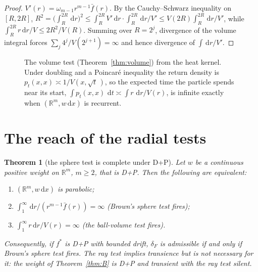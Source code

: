 \documentclass[11pt]{amsart}
\newcommand{\R}{\mathbb{R}}
\newcommand{\dd}{\,\mathrm{d}}
\newcommand{\fbar}{\bar f}
\theoremstyle{plain}
\newtheorem{theorem}{Theorem}[section]
\theoremstyle{definition}
\theoremstyle{remark}
\begin{document}
\begin{proof}
$V'(r)=\omega_{m-1}r^{m-1}\fbar(r)$. By the Cauchy--Schwarz inequality on
$[R,2R]$, $R^2=\bigl(\int_R^{2R}\dd r\bigr)^2\le\int_R^{2R}V'\dd r\cdot
\int_R^{2R}\dd r/V'\le V(2R)\int_R^{2R}\dd r/V'$, while
$\int_R^{2R}r\dd r/V\le2R^2/V(R)$. Summing over $R=2^j$, divergence of the
volume integral forces $\sum_j4^j/V(2^{j+1})=\infty$ and hence divergence of
$\int\dd r/V'$.
\end{proof}

\begin{figure}[t]
\centering
{}
\caption{The volume test (Theorem~\ref{thm:volume}) from the heat kernel. Under
doubling and a Poincar\'e inequality the return density is
$p_t(x,x)\asymp1/V(x,\sqrt t\,)$, so the expected time the particle spends near
its start, $\int p_t(x,x)\,\dd t\asymp\int r\,\dd r/V(r)$, is infinite exactly
when $(\R^m,w\dd x)$ is recurrent.}
\label{fig:heatkernel}
\end{figure}

\section{The reach of the radial tests}\label{sec:reach}

\begin{theorem}[the sphere test is complete under D+P]\label{thm:A}
Let $w$ be a continuous positive weight on $\R^m$, $m\ge2$, that is D+P. Then
the following are equivalent:
\begin{enumerate}[label=\textup{(\roman*)},leftmargin=2em,itemsep=1pt]
\item $(\R^m,w\dd x)$ is parabolic;
\item $\int_1^\infty\dd r/(r^{m-1}\fbar(r))=\infty$ (Brown's sphere test fires);
\item $\int_1^\infty r\dd r/V(r)=\infty$ (the ball-volume test fires).
\end{enumerate}
Consequently, if $f^*$ is D+P with bounded drift, $\delta_F$ is admissible if
and only if Brown's sphere test fires. The ray test implies transience but is
not necessary for it: the weight of Theorem~\ref{thm:B} is D+P and transient
with the ray test silent.
\end{theorem}
\end{document}
